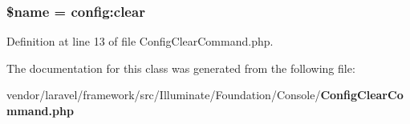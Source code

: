 \subsubsection[{\$name}]{\setlength{\rightskip}{0pt plus 5cm}\${\bf name} = \textquotesingle{}config\+:clear\textquotesingle{}\hspace{0.3cm}{\ttfamily [protected]}}\label{class_illuminate_1_1_foundation_1_1_console_1_1_config_clear_command_ab2fc40d43824ea3e1ce5d86dee0d763b}


Definition at line 13 of file Config\+Clear\+Command.\+php.



The documentation for this class was generated from the following file\+:\begin{DoxyCompactItemize}
\item 
vendor/laravel/framework/src/\+Illuminate/\+Foundation/\+Console/{\bf Config\+Clear\+Command.\+php}\end{DoxyCompactItemize}
